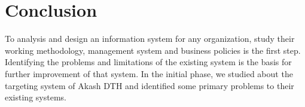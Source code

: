 \begin{spacing}{1.0}
\begin{enumerate}
\end{enumerate}

\section{Conclusion}
To analysis and design an information system for any organization, study their working methodology, management system and business policies is the first step. Identifying the problems and limitations of the existing system is the basis for further improvement of that system. In the initial phase, we studied about the targeting system of Akash DTH and identified some primary problems to their existing systems.     
\end{spacing}

\newpage
